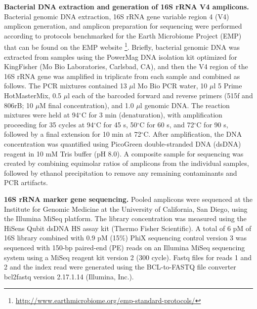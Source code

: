 \textbf{Bacterial DNA extraction and generation of 16S rRNA V4 amplicons.} Bacterial
genomic DNA extraction, 16S rRNA gene variable region 4 (V4) amplicon generation,
and amplicon preparation for sequencing were performed according to protocols benchmarked
for the Earth Microbiome Project (EMP) that can be found on the EMP
website \footnote{\url{http://www.earthmicrobiome.org/emp-standard-protocols/}}. Briefly,
bacterial genomic DNA was extracted from samples using the PowerMag DNA isolation kit
optimized for KingFisher (Mo Bio Laboratories, Carlsbad, CA), and then the V4 region
of the 16S rRNA gene was amplified in triplicate from each sample and combined as follows.
The PCR mixtures contained 13 $\mu$l Mo Bio PCR water, 10 $\mu$l 5 Prime HotMasterMix, 0.5
$\mu$l each of the barcoded forward and reverse primers (515f and 806rB; 10 $\mu$M final
concentration), and 1.0 $\mu$l genomic DNA. The reaction mixtures were held at 94$^{\circ}$C
for 3 min (denaturation), with amplification proceeding for 35 cycles at 94$^{\circ}$C for
45 s, 50$^{\circ}$C for 60 s, and 72$^{\circ}$C for 90 s, followed by a final extension
for 10 min at 72$^{\circ}$C. After amplification, the DNA concentration was quantified
using PicoGreen double-stranded DNA (dsDNA) reagent in 10 mM Tris buffer (pH 8.0). A
composite sample for sequencing was created by combining equimolar ratios of amplicons
from the individual samples, followed by ethanol precipitation to remove any remaining
contaminants and PCR artifacts.

\textbf{16S rRNA marker gene sequencing.} Pooled amplicons were sequenced at the
Institute for Genomic Medicine at the University of California, San Diego, using the
Illumina MiSeq platform. The library concentration was measured using the HiSens
Qubit dsDNA HS assay kit (Thermo Fisher Scientific). A total of 6 pM of 16S library
combined with 0.9 pM (15\%) PhiX sequencing control version 3 was sequenced with 150-bp
paired-end (PE) reads on an Illumina MiSeq sequencing system using a MiSeq reagent kit
version 2 (300 cycle). Fastq files for reads 1 and 2 and the index read were generated
using the BCL-to-FASTQ file converter bcl2fastq version 2.17.1.14 (Illumina, Inc.).

